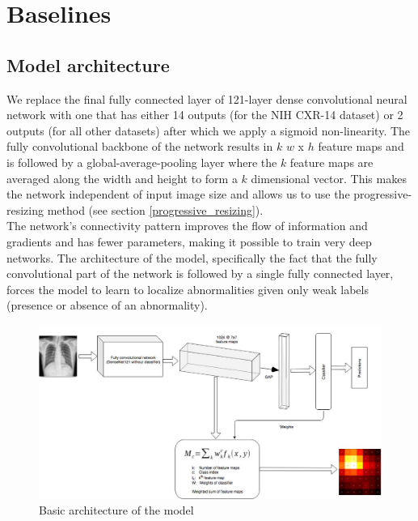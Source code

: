 \documentclass[12pt,oneside,a4paper]{report}
\begin{document}
\chapter{Baselines\label{baselines}}
\section{Model architecture\label{architecture}}
We replace the final fully connected layer of 121-layer dense convolutional
neural network with one that has either 14 outputs (for the NIH CXR-14 dataset)
or 2 outputs (for all other datasets) after which we apply a sigmoid
non-linearity. The fully convolutional backbone of the network results in $k$
$w$ x $h$ feature maps and is followed by a global-average-pooling layer where
the $k$ feature maps are averaged along the width and height to form a $k$
dimensional vector. This makes the network independent of input image size and
allows us to use the
progressive-resizing method (see section \ref{progressive_resizing}).\\

The network's connectivity pattern improves the flow of information and
gradients and has fewer parameters, making it possible to train very deep
networks. The architecture of the model, specifically the fact that the fully
convolutional part of the network is followed by a single fully connected layer,
forces the model to learn to localize abnormalities given only weak labels (presence or absence of an abnormality).\\

\begin{figure}
  \centering \includegraphics[width=\textwidth]{images/arch}
  \caption{Basic architecture of the model}
  \label{architecture}
\end{figure}
\end{document}
